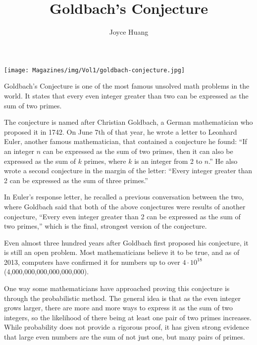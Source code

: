 \documentclass{article}
\title{Goldbach's Conjecture}
\author{Joyce Huang}
\begin{document}
\maketitle
\begin{center}
    \texttt{[image: Magazines/img/Vol1/goldbach-conjecture.jpg]}
\end{center}

Goldbach’s Conjecture is one of the most famous unsolved math problems in the world. It states that every even integer greater than two can be expressed as the sum of two primes. 

The conjecture is named after Christian Goldbach, a German mathematician who proposed it in 1742. On June 7th of that year, he wrote a letter to Leonhard Euler, another famous mathematician, that contained a conjecture he found: ``If an integer $n$ can be expressed as the sum of two primes, then it can also be expressed as the sum of $k$ primes, where $k$ is an integer from 2 to $n$.'' He also wrote a second conjecture in the margin of the letter: ``Every integer greater than 2 can be expressed as the sum of three primes.'' 

In Euler’s response letter, he recalled a previous conversation between the two, where Goldbach said that both of the above conjectures were results of another conjecture, ``Every even integer greater than 2 can be expressed as the sum of two primes,'' which is the final, strongest version of the conjecture.  

Even almost three hundred years after Goldbach first proposed his conjecture, it is still an open problem. Most mathematicians believe it to be true, and as of 2013, computers have confirmed it for numbers up to over $4\cdot10^{18}$ (4,000,000,000,000,000,000). 

One way some mathematicians have approached proving this conjecture is through the probabilistic method. The general idea is that as the even integer grows larger, there are more and more ways to express it as the sum of two integers, so the likelihood of there being at least one pair of two primes increases. While probability does not provide a rigorous proof, it has given strong evidence that large even numbers are the sum of not just one, but many pairs of primes.
\end{document}
